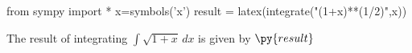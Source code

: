 \documentclass[11pt]{article}%
\begin{document}
 
\begin{pycode} 
from sympy import * 
x=symbols('x') 
result = latex(integrate("(1+x)**(1/2)",x)) 
\end{pycode} 
 
The result of integrating $\int \sqrt{ 1+x } \, dx$ is given by $\py{result}$ 
 
\end{document}
